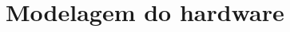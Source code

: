\documentclass[../../layout.tex]{subfiles}
\begin{document}
\chapter{Modelagem do hardware}
\blindtext
\end{document}
